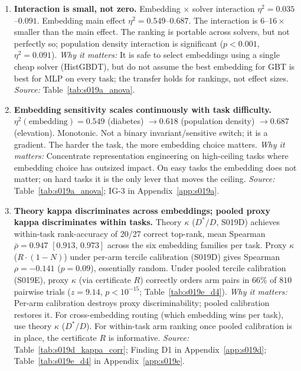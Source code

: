 \documentclass{article}
\begin{document}
\begin{enumerate}
\item \textbf{Interaction is small, not zero.}
Embedding $\times$ solver interaction $\eta^2 = 0.035$--$0.091$. Embedding main effect $\eta^2 = 0.549$--$0.687$. The interaction is $6$--$16{\times}$ smaller than the main effect. The ranking is portable across solvers, but not perfectly so; population density interaction is significant ($p < 0.001$, $\eta^2 = 0.091$).
\emph{Why it matters:} It is safe to select embeddings using a single cheap solver (HistGBDT), but do not assume the best embedding for GBT is best for MLP on every task; the transfer holds for rankings, not effect sizes.
\emph{Source:} Table~\ref{tab:s019a_anova}.

\item \textbf{Embedding sensitivity scales continuously with task difficulty.}
$\eta^2(\text{embedding}) = 0.549$ (diabetes) $\to 0.618$ (population density) $\to 0.687$ (elevation). Monotonic. Not a binary invariant/sensitive switch; it is a gradient. The harder the task, the more embedding choice matters.
\emph{Why it matters:} Concentrate representation engineering on high-ceiling tasks where embedding choice has outsized impact. On easy tasks the embedding does not matter; on hard tasks it is the only lever that moves the ceiling.
\emph{Source:} Table~\ref{tab:s019a_anova}; IG-3 in Appendix~\ref{app:s019a}.

\item \textbf{Theory kappa discriminates across embeddings; pooled proxy kappa discriminates within tasks.}
Theory $\kappa$ ($D^*/D$, S019D) achieves within-task rank-accuracy of 20/27 correct top-rank, mean Spearman $\bar{\rho} = 0.947$ $[0.913,\, 0.973]$ across the six embedding families per task. Proxy $\kappa$ ($R{\cdot}(1{-}N)$) under per-arm tercile calibration (S019D) gives Spearman $\rho = -0.141$ ($p = 0.09$), essentially random. Under pooled tercile calibration (S019E), proxy $\kappa$ (via certificate $R$) correctly orders arm pairs in 66\% of $810$ pairwise trials ($z = 9.14$, $p < 10^{-15}$; Table~\ref{tab:s019e_d4}).
\emph{Why it matters:} Per-arm calibration destroys proxy discriminability; pooled calibration restores it. For cross-embedding routing (which embedding wins per task), use theory $\kappa$ ($D^*/D$). For within-task arm ranking once pooled calibration is in place, the certificate $R$ is informative.
\emph{Source:} Table~\ref{tab:s019d_kappa_corr}; Finding D1 in Appendix~\ref{app:s019d}; Table~\ref{tab:s019e_d4} in Appendix~\ref{app:s019e}.


\end{enumerate}
\end{document}
